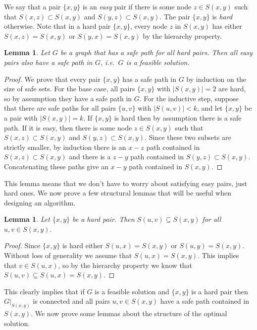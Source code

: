 \documentclass[11pt,letterpaper]{article}
\newtheorem{lemma}[theorem]{Lemma}
\theoremstyle{definition}
\begin{document}
We say that a pair $\{x,y\}$ is an \emph{easy} pair if there is some
node $z \in S(x,y)$ such that $S(x,z) \subset S(x,y)$ and $S(y,z)
\subset S(x,y)$.  The pair $\{x,y\}$ is \emph{hard} otherwise.  Note
that in a hard pair $\{x,y\}$, every node $z$ in $S(x,y)$ has either
$S(x,z) = S(x,y)$ or $S(y,x) = S(x,y)$ by the hierarchy property.

\begin{lemma} \label{lem:hierarchy_easy}
  Let $G$ be a graph that has a safe path for all hard pairs.  Then
  all easy pairs also have a safe path in $G$, i.e.\ $G$ is a feasible
  solution.
\end{lemma}
\begin{proof}
  We prove that every pair $\{x,y\}$ has a safe path in $G$ by
  induction on the size of safe sets.  For the base case, all pairs
  $\{x,y\}$ with $|S(x,y)| = 2$ are hard, so by assumption they have a
  safe path in $G$.  For the inductive step, suppose that there are
  safe paths for all pairs $\{u,v\}$ with $|S(u,v)| < k$, and let
  $\{x,y\}$ be a pair with $|S(x,y)| = k$.  If $\{x,y\}$ is hard then
  by assumption there is a safe path.  If it is easy, then there is
  some node $z \in S(x,y)$ such that $S(x,z) \subset S(x,y)$ and
  $S(y,z) \subset S(x,y)$.  Since these two subsets are strictly
  smaller, by induction there is an $x-z$ path contained in $S(x,z)
  \subset S(x,y)$ and there is a $z-y$ path contained in $S(y,z)
  \subset S(x,y)$.  Concatenating these paths give an $x-y$ path
  contained in $S(x,y)$.
\end{proof}


This lemma means that we don't have to worry about satisfying easy
pairs, just hard ones.  We now prove a few structural lemmas that will be useful when designing an algorithm.


\begin{lemma} \label{lem:hierarchy_strong_containment} Let $\{x,y\}$
  be a hard pair.  Then $S(u,v) \subseteq S(x,y)$ for all $u,v \in
  S(x,y)$.
\end{lemma}
\begin{proof}
  Since $\{x,y\}$ is hard either $S(u,x) = S(x,y)$ or $S(u,y) =
  S(x,y)$.  Without loss of generality we assume that $S(u,x) =
  S(x,y)$.  This implies that $v \in S(u,x)$, so by the hierarchy
  property we know that $S(u,v) \subseteq S(u,x) = S(x,y)$.
\end{proof}

This clearly implies that if $G$ is a feasible solution and $\{x,y\}$
is a hard pair then $G|_{S(x,y)}$ is connected and all pairs $u,v \in
S(x,y)$ have a safe path contained in $S(x,y)$.  We now prove some
lemmas about the structure of the optimal solution.
\end{document}
